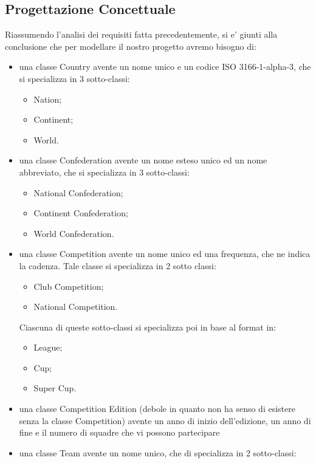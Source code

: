 \newpage
\subsection{\Large Progettazione Concettuale}

Riassumendo l'analisi dei requisiti fatta precedentemente, si e' giunti alla conclusione
che per modellare il nostro progetto avremo bisogno di:
\begin{itemize}
	\item una classe Country avente un nome unico e un codice ISO 3166-1-alpha-3,
		che si specializza in 3 sotto-classi:	
		\begin{itemize}
			\item Nation;
			\item Continent;
			\item World.
		\end{itemize}
	\item una classe Confederation avente un nome esteso unico ed un nome abbreviato,
		che si specializza in 3 sotto-classi:	
		\begin{itemize}
			\item National Confederation;
			\item Continent Confederation;
			\item World Confederation.
		\end{itemize}
	\item una classe Competition avente un nome unico ed una frequenza, che ne indica la
		cadenza. Tale classe si specializza in 2 sotto classi:	
		\begin{itemize}
			\item Club Competition;
			\item National Competition.
		\end{itemize}	
		Ciascuna di queste sotto-classi si specializza poi in base al format in:
		\begin{itemize}
			\item League;
			\item Cup;
			\item Super Cup.
		\end{itemize}
	\item una classe Competition Edition (debole in quanto non ha senso di esistere
		senza la classe Competition) avente un anno di inizio dell'edizione, un anno di fine
		e il numero di squadre che vi possono partecipare	
	\item una classe Team avente un nome unico, che di specializza in 2 sotto-classi:
		\begin{itemize}

\end{itemize}
\end{itemize}
